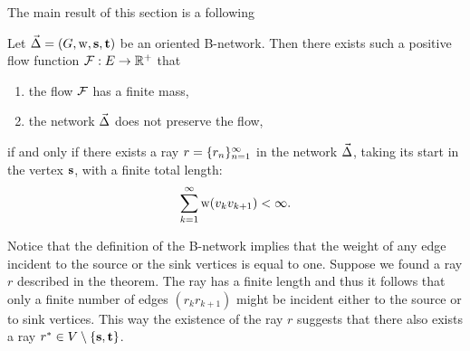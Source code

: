 \documentclass[12pt]{amsart}
\begin{document}
    The main result of this section is a following
    \begin{theorem}
      \label{ray-thm}
      Let $\vec{\Delta} = (G, \mathrm{w}, \mathbf{s}, \mathbf{t})$ be an oriented B-network.
      Then there exists such a positive flow function $\mathcal{F}: E \to \mathbb{R}^{+}$ that
      \begin{enumerate}[label=(\alph*)]
        \item the flow $\mathcal{F}$ has a finite mass,
        \item the network $\vec{\Delta}$ does not preserve the flow,
      \end{enumerate}
        if and only if there exists a ray $r = \{{r}_n\}_{n=1}^\infty$ in the network $\vec{\Delta}$, taking its start in the vertex $\mathbf{s}$,
          with a finite total length:
        \[
          \sum_{k=1}^\infty \mathrm{w}(v_k v_{k+1}) < \infty.
        \]
    \end{theorem}
    \begin{remark}
      \label{inner-ray-rmk}
      Notice that the definition of the B-network implies that the weight of any edge
        incident to the source or the sink vertices is equal to one.
      Suppose we found a ray $r$ described in the theorem.
      The ray has a finite length and thus it follows that only a finite number of edges $(r_k r_{k+1})$ might
        be incident either to the source or to sink vertices.
      This way the existence of the ray $r$ suggests that there also exists a ray $r^* \in V \setminus \left\{\mathbf{s}, \mathbf{t}\right\}$.
    \end{remark}
\end{document}
